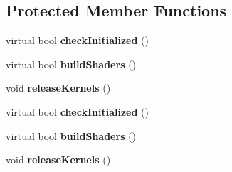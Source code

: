 \subsection*{Protected Member Functions}
\begin{DoxyCompactItemize}
\item 
\mbox{\label{classbtSoftBodySolverOutputCLtoGL_aa0a1401e61bfb5856789cdc83e8b35ba}} 
virtual bool {\bfseries check\+Initialized} ()
\item 
\mbox{\label{classbtSoftBodySolverOutputCLtoGL_a79b30ac51a34a83bff1157d0fc6192da}} 
virtual bool {\bfseries build\+Shaders} ()
\item 
\mbox{\label{classbtSoftBodySolverOutputCLtoGL_ab00f748915e812c08e2d21746b09b877}} 
void {\bfseries release\+Kernels} ()
\item 
\mbox{\label{classbtSoftBodySolverOutputCLtoGL_a24611340b3378b2a7039e1fd2046864f}} 
virtual bool {\bfseries check\+Initialized} ()
\item 
\mbox{\label{classbtSoftBodySolverOutputCLtoGL_a99ef3a153144bad6ebe92306dae4588b}} 
virtual bool {\bfseries build\+Shaders} ()
\item 
\mbox{\label{classbtSoftBodySolverOutputCLtoGL_ab00f748915e812c08e2d21746b09b877}} 
void {\bfseries release\+Kernels} ()
\end{DoxyCompactItemize}
